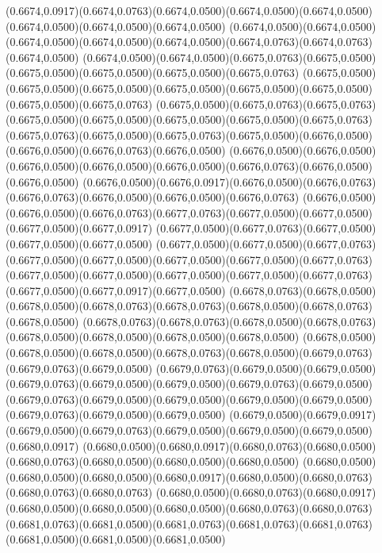 (0.6674,0.0917)(0.6674,0.0763)(0.6674,0.0500)(0.6674,0.0500)(0.6674,0.0500)(0.6674,0.0500)(0.6674,0.0500)(0.6674,0.0500)
(0.6674,0.0500)(0.6674,0.0500)(0.6674,0.0500)(0.6674,0.0500)(0.6674,0.0500)(0.6674,0.0763)(0.6674,0.0763)(0.6674,0.0500)
(0.6674,0.0500)(0.6674,0.0500)(0.6675,0.0763)(0.6675,0.0500)(0.6675,0.0500)(0.6675,0.0500)(0.6675,0.0500)(0.6675,0.0763)
(0.6675,0.0500)(0.6675,0.0500)(0.6675,0.0500)(0.6675,0.0500)(0.6675,0.0500)(0.6675,0.0500)(0.6675,0.0500)(0.6675,0.0763)
(0.6675,0.0500)(0.6675,0.0763)(0.6675,0.0763)(0.6675,0.0500)(0.6675,0.0500)(0.6675,0.0500)(0.6675,0.0500)(0.6675,0.0763)
(0.6675,0.0763)(0.6675,0.0500)(0.6675,0.0763)(0.6675,0.0500)(0.6676,0.0500)(0.6676,0.0500)(0.6676,0.0763)(0.6676,0.0500)
(0.6676,0.0500)(0.6676,0.0500)(0.6676,0.0500)(0.6676,0.0500)(0.6676,0.0500)(0.6676,0.0763)(0.6676,0.0500)(0.6676,0.0500)
(0.6676,0.0500)(0.6676,0.0917)(0.6676,0.0500)(0.6676,0.0763)(0.6676,0.0763)(0.6676,0.0500)(0.6676,0.0500)(0.6676,0.0763)
(0.6676,0.0500)(0.6676,0.0500)(0.6676,0.0763)(0.6677,0.0763)(0.6677,0.0500)(0.6677,0.0500)(0.6677,0.0500)(0.6677,0.0917)
(0.6677,0.0500)(0.6677,0.0763)(0.6677,0.0500)(0.6677,0.0500)(0.6677,0.0500)
\PST@Solid(0.6677,0.0500)(0.6677,0.0500)(0.6677,0.0763)(0.6677,0.0500)(0.6677,0.0500)(0.6677,0.0500)(0.6677,0.0500)(0.6677,0.0763)
(0.6677,0.0500)(0.6677,0.0500)(0.6677,0.0500)(0.6677,0.0500)(0.6677,0.0763)(0.6677,0.0500)(0.6677,0.0917)(0.6677,0.0500)
(0.6678,0.0763)(0.6678,0.0500)(0.6678,0.0500)(0.6678,0.0763)(0.6678,0.0763)(0.6678,0.0500)(0.6678,0.0763)(0.6678,0.0500)
(0.6678,0.0763)(0.6678,0.0763)(0.6678,0.0500)(0.6678,0.0763)(0.6678,0.0500)(0.6678,0.0500)(0.6678,0.0500)(0.6678,0.0500)
(0.6678,0.0500)(0.6678,0.0500)(0.6678,0.0500)(0.6678,0.0763)(0.6678,0.0500)(0.6679,0.0763)(0.6679,0.0763)(0.6679,0.0500)
(0.6679,0.0763)(0.6679,0.0500)(0.6679,0.0500)(0.6679,0.0763)(0.6679,0.0500)(0.6679,0.0500)(0.6679,0.0763)(0.6679,0.0500)
(0.6679,0.0763)(0.6679,0.0500)(0.6679,0.0500)(0.6679,0.0500)(0.6679,0.0500)(0.6679,0.0763)(0.6679,0.0500)(0.6679,0.0500)
(0.6679,0.0500)(0.6679,0.0917)(0.6679,0.0500)(0.6679,0.0763)(0.6679,0.0500)(0.6679,0.0500)(0.6679,0.0500)(0.6680,0.0917)
(0.6680,0.0500)(0.6680,0.0917)(0.6680,0.0763)(0.6680,0.0500)(0.6680,0.0763)(0.6680,0.0500)(0.6680,0.0500)(0.6680,0.0500)
(0.6680,0.0500)(0.6680,0.0500)(0.6680,0.0500)(0.6680,0.0917)(0.6680,0.0500)(0.6680,0.0763)(0.6680,0.0763)(0.6680,0.0763)
(0.6680,0.0500)(0.6680,0.0763)(0.6680,0.0917)(0.6680,0.0500)(0.6680,0.0500)(0.6680,0.0500)(0.6680,0.0763)(0.6680,0.0763)
(0.6681,0.0763)(0.6681,0.0500)(0.6681,0.0763)(0.6681,0.0763)(0.6681,0.0763)(0.6681,0.0500)(0.6681,0.0500)(0.6681,0.0500)

